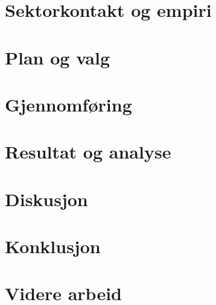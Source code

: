 \documentclass[12pt]{report}
\begin{document}
\chapter{Sektorkontakt og empiri}


\chapter{Plan og valg}



\chapter{Gjennomføring}



\chapter{Resultat og analyse}
\label{chap:res_og_anal}



\chapter{Diskusjon}



\chapter{Konklusjon}



\chapter{Videre arbeid}










\end{document}
